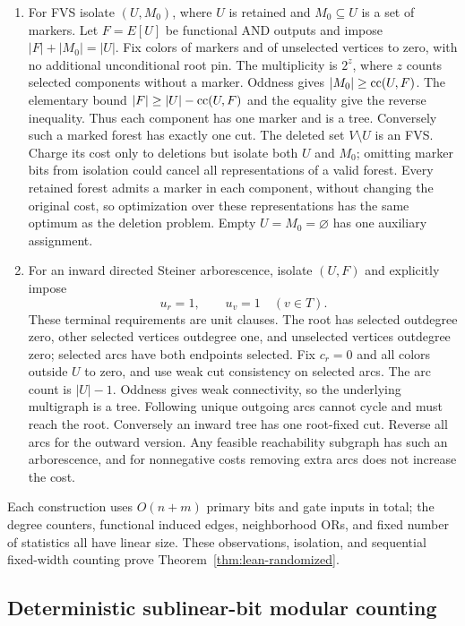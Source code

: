 \begin{enumerate}
\item For FVS isolate $(U,M_0)$, where $U$ is retained and
$M_0\subseteq U$ is a set of markers. Let $F=E[U]$ be functional
AND outputs and impose $|F|+|M_0|=|U|$. Fix colors of markers and
of unselected vertices to zero, with no additional unconditional
root pin. The multiplicity is $2^z$, where $z$ counts selected
components without a marker. Oddness gives $|M_0|\ge\operatorname{cc}(U,F)$.
The elementary bound $|F|\ge|U|-\operatorname{cc}(U,F)$ and the equality give
the reverse inequality. Thus each component has one marker and
is a tree. Conversely such a marked forest has exactly one cut.
The deleted set $V\setminus U$ is an FVS. Charge its cost only to
deletions but isolate both $U$ and $M_0$; omitting marker bits from
isolation could cancel all representations of a valid forest.
Every retained forest admits a marker in each component, without
changing the original cost, so optimization over these representations
has the same optimum as the deletion problem.
Empty $U=M_0=\varnothing$ has one auxiliary assignment.

\item For an inward directed Steiner arborescence, isolate $(U,F)$
and explicitly impose
\[
 u_r=1,\qquad u_v=1\quad(v\in T).
\]
These terminal requirements are unit clauses. The root has selected
outdegree zero, other selected vertices outdegree one, and unselected
vertices outdegree zero; selected arcs have both endpoints selected.
Fix $c_r=0$ and all colors outside $U$ to zero, and use weak cut
consistency on selected arcs. The arc count is $|U|-1$.
Oddness gives weak connectivity, so the underlying multigraph is a
tree. Following unique outgoing arcs cannot cycle and must reach
the root. Conversely an inward tree has one root-fixed cut.
Reverse all arcs for the outward version. Any feasible reachability
subgraph has such an arborescence, and for nonnegative costs removing
extra arcs does not increase the cost.
\end{enumerate}

Each construction uses $O(n+m)$ primary bits and gate inputs in total;
the degree counters, functional induced edges, neighborhood ORs, and
fixed number of statistics all have linear size. These observations,
isolation, and sequential fixed-width counting prove
Theorem~\ref{thm:lean-randomized}.

\subsection{Deterministic sublinear-bit modular counting}
\label{sec:lean-modular}

